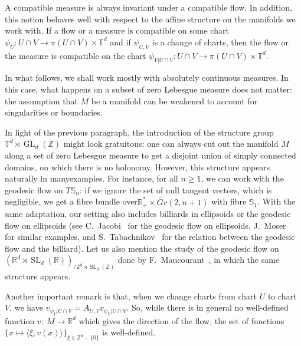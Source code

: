 \documentclass[AHL,Unicode,longabstracts]{cedram}
\DeclareMathOperator{\GL}{GL}
\DeclareMathOperator{\SL}{SL}
\newcommand{\Z}{\mathbb{Z}}
\newcommand{\R}{\mathbb{R}}
\newcommand{\Sbb}{\mathbb{S}}
\newcommand{\Tbb}{\mathbb{T}}
\begin{document}
A compatible measure is always invariant under a compatible flow. In addition, this notion behaves well with respect to the affine structure on the manifolds we work with. If a flow or a measure is compatible on some chart $\psi_U: U \cap V \to \pi (U \cap V) \times \Tbb^d$ and if $\psi_{U,V}$ is a change of charts, then the flow or the measure is compatible on the chart $\psi_{V|U \cap V}: U \cap V \to \pi (U \cap V) \times \Tbb^d$.


In what follows, we shall work mostly with absolutely continuous measures. In this case, what happens on a subset of zero Lebesgue measure does not matter: the assumption that $M$ be a manifold can be weakened to account for singularities or boundaries.


In light of the previous paragraph, the introduction of the structure group $\Tbb^d \rtimes \GL_d (\Z)$ might look gratuitous: one can always cut out the manifold $M$ along a set of zero Lebesgue measure to get a disjoint union of simply connected domains, on which there is no holonomy. However, this structure appears naturally in many\linebreak examples. For instance, for all $n \geq 1$, we can work with the geodesic flow on $T \Sbb_n$: if we ignore the set of null tangent vectors, which is negligible, we get a fibre bundle over\linebreak$\R_+^* \times \widetilde{Gr} (2, n+1)$ with fibre $\Sbb_1$. With the same adaptation, our setting also includes billiards in ellipsoids or the geodesic flow on ellipsoids (see C.~Jacobi~\cite{Jacobi:1866} for the geodesic flow on ellipsoids, J.~Moser~\cite{Moser:1978} for similar examples, and S.~Tabachnikov~\cite{Tabachnikov:2002} for the relation between the geodesic flow and the billiard). Let us also mention the study of the geodesic flow on $(\R^d \rtimes \SL_d (\R))_{/ \Z^d \rtimes\SL_d (\Z)}$ done by F.~Maucourant~\cite{Maucourant:2016}, in which the same structure appears.


Another important remark is that, when we change charts from chart $U$ to chart $V$, we have $v_{\psi_V | U \cap V} = A_{U, V} v_{\psi_U | U \cap V}$. So, while there is in general no well-defined function $v : \ M \to \R^d$ which gives the direction of the flow, the set of functions $\{x \mapsto \langle \xi, v(x) \rangle\}_{\xi \in \Z^d - \{0\}}$ is well-defined.

\end{document}
